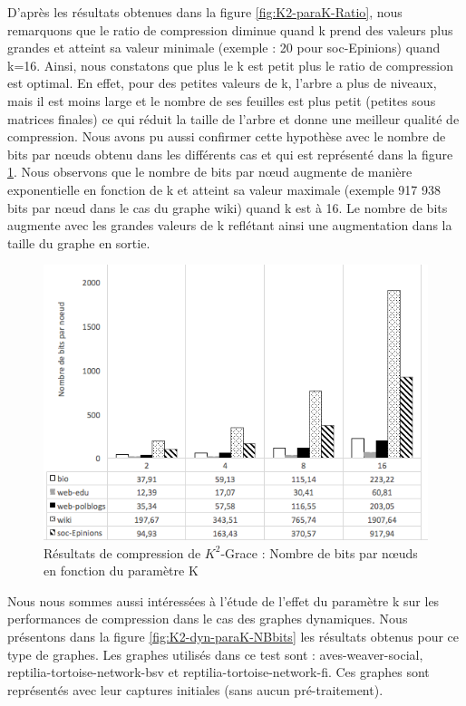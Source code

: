 D'après les résultats obtenues dans la figure \ref{fig:K2-paraK-Ratio}, nous remarquons que le ratio de compression diminue quand k prend des valeurs plus grandes et atteint sa valeur minimale (exemple : 20 pour soc-Epinions) quand k=16. Ainsi, nous constatons que plus le k est petit plus le ratio de compression est optimal. En effet, pour des petites valeurs de k, l'arbre a plus de niveaux, mais il est moins large et le nombre de ses feuilles est plus petit (petites sous matrices finales) ce qui réduit la taille de l'arbre et donne une meilleur qualité de compression. Nous avons pu aussi confirmer cette hypothèse avec le nombre de bits par nœuds obtenu dans les différents cas et qui est représenté dans la figure \ref{fig:K2-paraK-NBbits}. Nous observons que le nombre de bits par nœud augmente de manière exponentielle en fonction de k et atteint sa valeur maximale (exemple 917 938 bits par nœud dans le cas du graphe wiki) quand k est à 16. Le nombre de bits augmente avec les grandes valeurs de k reflétant ainsi une augmentation dans la taille du graphe en sortie.

\begin{figure}[H]
	\centering
	\includegraphics[scale=0.8]{ressources/image/Tests/K2-paraK-NBbits.png}
	
	\caption{Résultats de compression de $K^2$-Grace : Nombre de bits par nœuds en fonction du paramètre K}
	\label{fig:K2-paraK-NBbits}
\end{figure}		


Nous nous sommes aussi intéressées à l'étude de l'effet du paramètre k sur les performances de compression dans le cas des graphes dynamiques. Nous présentons dans la figure \ref{fig:K2-dyn-paraK-NBbits} les résultats obtenus pour ce type de graphes. Les graphes utilisés dans ce test sont : aves-weaver-social, reptilia-tortoise-network-bsv et reptilia-tortoise-network-fi. Ces graphes sont représentés avec leur captures initiales (sans aucun pré-traitement).

